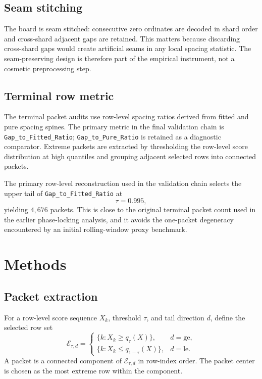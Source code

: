 \documentclass[11pt]{article}
\newcommand{\primarypackets}{4{,}676}
\begin{document}
\subsection{Seam stitching}

The board is seam stitched: consecutive zero ordinates are decoded in shard order and cross-shard adjacent gaps are retained. This matters because discarding cross-shard gaps would create artificial seams in any local spacing statistic. The seam-preserving design is therefore part of the empirical instrument, not a cosmetic preprocessing step.

\subsection{Terminal row metric}

The terminal packet audits use row-level spacing ratios derived from fitted and pure spacing spines. The primary metric in the final validation chain is \texttt{Gap\_to\_Fitted\_Ratio}; \texttt{Gap\_to\_Pure\_Ratio} is retained as a diagnostic comparator. Extreme packets are extracted by thresholding the row-level score distribution at high quantiles and grouping adjacent selected rows into connected packets.

The primary row-level reconstruction used in the validation chain selects the upper tail of \texttt{Gap\_to\_Fitted\_Ratio} at
\[
\tau=0.995,
\]
yielding \(\primarypackets\) packets. This is close to the original terminal packet count used in the earlier phase-locking analysis, and it avoids the one-packet degeneracy encountered by an initial rolling-window proxy benchmark.

\section{Methods}

\subsection{Packet extraction}

For a row-level score sequence \(X_k\), threshold \(\tau\), and tail direction \(d\), define the selected row set
\[
\mathcal{E}_{\tau,d}
=
\begin{cases}
\{k:X_k\ge q_\tau(X)\}, & d=\mathrm{ge},\\[4pt]
\{k:X_k\le q_{1-\tau}(X)\}, & d=\mathrm{le}.
\end{cases}
\]
A packet is a connected component of \(\mathcal{E}_{\tau,d}\) in row-index order. The packet center is chosen as the most extreme row within the component.
\end{document}
